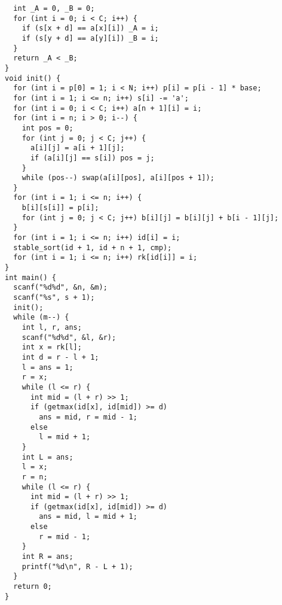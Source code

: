 \begin{lstlisting}
  int _A = 0, _B = 0;
  for (int i = 0; i < C; i++) {
    if (s[x + d] == a[x][i]) _A = i;
    if (s[y + d] == a[y][i]) _B = i;
  }
  return _A < _B;
}
void init() {
  for (int i = p[0] = 1; i < N; i++) p[i] = p[i - 1] * base;
  for (int i = 1; i <= n; i++) s[i] -= 'a';
  for (int i = 0; i < C; i++) a[n + 1][i] = i;
  for (int i = n; i > 0; i--) {
    int pos = 0;
    for (int j = 0; j < C; j++) {
      a[i][j] = a[i + 1][j];
      if (a[i][j] == s[i]) pos = j;
    }
    while (pos--) swap(a[i][pos], a[i][pos + 1]);
  }
  for (int i = 1; i <= n; i++) {
    b[i][s[i]] = p[i];
    for (int j = 0; j < C; j++) b[i][j] = b[i][j] + b[i - 1][j];
  }
  for (int i = 1; i <= n; i++) id[i] = i;
  stable_sort(id + 1, id + n + 1, cmp);
  for (int i = 1; i <= n; i++) rk[id[i]] = i;
}
int main() {
  scanf("%d%d", &n, &m);
  scanf("%s", s + 1);
  init();
  while (m--) {
    int l, r, ans;
    scanf("%d%d", &l, &r);
    int x = rk[l];
    int d = r - l + 1;
    l = ans = 1;
    r = x;
    while (l <= r) {
      int mid = (l + r) >> 1;
      if (getmax(id[x], id[mid]) >= d)
        ans = mid, r = mid - 1;
      else
        l = mid + 1;
    }
    int L = ans;
    l = x;
    r = n;
    while (l <= r) {
      int mid = (l + r) >> 1;
      if (getmax(id[x], id[mid]) >= d)
        ans = mid, l = mid + 1;
      else
        r = mid - 1;
    }
    int R = ans;
    printf("%d\n", R - L + 1);
  }
  return 0;
}
\end{lstlisting}